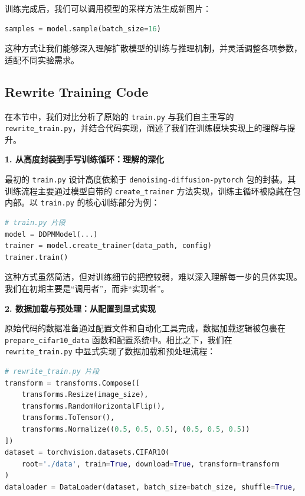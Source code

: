 \documentclass{ctexart}
\begin{document}
\noindent
训练完成后，我们可以调用模型的采样方法生成新图片：

\begin{lstlisting}[language=python]
samples = model.sample(batch_size=16)
\end{lstlisting}
\noindent
这种方式让我们能够深入理解扩散模型的训练与推理机制，并灵活调整各项参数，适配不同实验需求。


\subsection{Rewrite Training Code}
\noindent
在本节中，我们对比分析了原始的 \texttt{train.py} 与我们自主重写的 \texttt{rewrite\_train.py}，并结合代码实现，阐述了我们在训练模块实现上的理解与提升。

\vspace{0.5em}
\noindent
\textbf{1. 从高度封装到手写训练循环：理解的深化}

\noindent
最初的 \texttt{train.py} 设计高度依赖于 \texttt{denoising-diffusion-pytorch} 包的封装。其训练流程主要通过模型自带的 \texttt{create\_trainer} 方法实现，训练主循环被隐藏在包内部。以 \texttt{train.py} 的核心训练部分为例：

\begin{lstlisting}[language=python]
# train.py 片段
model = DDPMModel(...)
trainer = model.create_trainer(data_path, config)
trainer.train()
\end{lstlisting}

\noindent
这种方式虽然简洁，但对训练细节的把控较弱，难以深入理解每一步的具体实现。我们在初期主要是“调用者”，而非“实现者”。

\vspace{0.5em}
\noindent
\textbf{2. 数据加载与预处理：从配置到显式实现}

\noindent
原始代码的数据准备通过配置文件和自动化工具完成，数据加载逻辑被包裹在 \texttt{prepare\_cifar10\_data} 函数和配置系统中。相比之下，我们在 \texttt{rewrite\_train.py} 中显式实现了数据加载和预处理流程：

\begin{lstlisting}[language=python]
# rewrite_train.py 片段
transform = transforms.Compose([
    transforms.Resize(image_size),
    transforms.RandomHorizontalFlip(),
    transforms.ToTensor(),
    transforms.Normalize((0.5, 0.5, 0.5), (0.5, 0.5, 0.5))
])
dataset = torchvision.datasets.CIFAR10(
    root='./data', train=True, download=True, transform=transform
)
dataloader = DataLoader(dataset, batch_size=batch_size, shuffle=True, ...)
\end{lstlisting}
\end{document}
